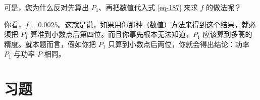 \begin{dialogue}
\stdb 可是，您为什么反对先算出 $P_{1}$、再把数值代入式 \eqref{eq-187} 来求 $f$ 的做法呢？

\tchr 你看，$f=0.0025$。这就是说，如果用你那种（数值）方法来得到这个结果，就必须把 $P_{1}$ 算准到小数点后第四位。而且你事先根本无法知道，$P_{1}$ 应该算到多高的精度。就本题而言，假如你把 $P_{1}$ 只算到小数点后两位，你就会得出结论：功率 $P_{1}$ 与功率 $P$ 相同。

\end{dialogue}

\section*{习题}
\label{prob-30}

